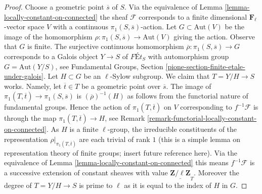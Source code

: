 \documentclass[10pt,a4paper]{amsart}
\theoremstyle{plain}
\theoremstyle{definition}
\theoremstyle{remark}
\numberwithin{equation}{subsection}
\begin{document}
\begin{proof}
Choose a geometric point $\overline{s}$ of $S$.
Via the equivalence of Lemma \ref{lemma-locally-constant-on-connected}
the sheaf $\mathcal{F}$ corresponds to a finite dimensional
$\mathbf{F}_\ell$-vector space $V$ with a continuous
$\pi_1(S, \overline{s})$-action.
Let $G \subset \text{Aut}(V)$ be the image of the homomorphism
$\rho : \pi_1(S, \overline{s}) \to \text{Aut}(V)$ giving the action.
Observe that $G$ is finite.
The surjective continuous homomorphism
$\overline{\rho} : \pi_1(S, \overline{s}) \to G$
corresponds to a Galois object $Y \to S$ of
$\textit{F\'Et}_S$ with automorphism group $G = \text{Aut}(Y/S)$, see
Fundamental Groups, Section \ref{pione-section-finite-etale-under-galois}.
Let $H \subset G$ be an $\ell$-Sylow subgroup.
We claim that $T = Y/H \to S$ works. Namely, let $\overline{t} \in T$
be a geometric point over $\overline{s}$. The image of
$\pi_1(T, \overline{t}) \to \pi_1(S, \overline{s})$
is $(\overline{\rho})^{-1}(H)$ as follows from the functorial
nature of fundamental groups. Hence the action of $\pi_1(T, \overline{t})$
on $V$ corresponding to $f^{-1}\mathcal{F}$ is through
the map $\pi_1(T, \overline{t}) \to H$, see
Remark \ref{remark-functorial-locally-constant-on-connected}. As
$H$ is a finite $\ell$-group, the irreducible constituents of the
representation $\rho|_{\pi_1(T, \overline{t})}$
are each trivial of rank $1$ (this is a simple lemma on
representation theory of finite groups; insert future reference here).
Via the equivalence of
Lemma \ref{lemma-locally-constant-on-connected}
this means $f^{-1}\mathcal{F}$ is a successive extension of
constant sheaves with value $\underline{\mathbf{Z}/\ell\mathbf{Z}}_T$.
Moreover the degree of $T = Y/H \to S$ is prime to $\ell$
as it is equal to the index of $H$ in $G$.
\end{proof}
\end{document}
